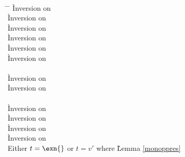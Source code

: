\begin{description}
\item[] \ \\
  \begin{tabbing}
  \hspace{3em} \= \hspace{3em} \= \kill
    \` Inversion on  \\
    \` Inversion on  \\
    \` Inversion on  \\
    \` Inversion on  \\
    \` Inversion on  \\
    \` Inversion on  \\
  \\
    \` Inversion on  \\
    \` Inversion on  \\
   \\
    \` Inversion on  \\
    \` Inversion on  \\
    \` Inversion on  \\
    \` Inversion on  \\
  Either $t = \exn{}$ or $t = v'$ where 
    \` Lemma \ref{monoppres} \\

\end{tabbing}
\end{description}
